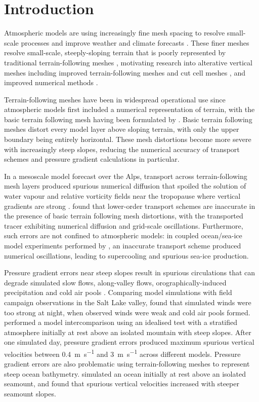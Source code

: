 \chapter{Introduction}

Atmospheric models are using increasingly fine mesh spacing to resolve small-scale processes and improve weather and climate forecasts \citep{wedi2014}.
These finer meshes resolve small-scale, steeply-sloping terrain that is poorly represented by traditional terrain-following meshes \citep{schaer2002}, motivating research into alterative vertical meshes including improved terrain-following meshes \citep{schaer2002,klemp2011} and cut cell meshes \citep{jaehn2015,yamazaki2016}, and improved numerical methods \citep{zaengl2012,steppeler-klemp2017}.

Terrain-following meshes have been in widespread operational use since atmospheric models first included a numerical representation of terrain, with the basic terrain following mesh having been formulated by \citet{galchen-somerville1975a}.
Basic terrain following meshes distort every model layer above sloping terrain, with only the upper boundary being entirely horizontal.
These mesh distortions become more severe with increasingly steep slopes, reducing the numerical accuracy of transport schemes and pressure gradient calculations in particular.

In a mesoscale model forecast over the Alps, transport across terrain-following mesh layers produced spurious numerical diffusion that spoiled the solution of water vapour and relative vorticity fields near the tropopause where vertical gradients are strong \citep{hoinka-zaengl2004}.
\citet{schaer2002} found that lower-order transport schemes are inaccurate in the presence of basic terrain following mesh distortions, with the transported tracer exhibiting numerical diffusion and grid-scale oscillations.
Furthermore, such errors are not confined to atmospheric models: in coupled ocean/sea-ice model experiments performed by \citet{naughten2017}, an inaccurate transport scheme produced numerical oscillations, leading to supercooling and spurious sea-ice production.

Pressure gradient errors near steep slopes result in spurious circulations that can degrade simulated slow flows, along-valley flows, orographically-induced precipitation and cold air pools \citep{zaengl2004a}.
Comparing model simulations with field campaign observations in the Salt Lake valley, \citet{fast2003} found that simulated winds were too strong at night, when observed winds were weak and cold air pools formed.
\citet{zaengl2004a} performed a model intercomparison using an idealised test with a stratified atmosphere initially at rest above an isolated mountain with steep slopes.
After one simulated day, pressure gradient errors produced maximum spurious vertical velocities between \SI{0.4}{\meter\per\second} and \SI{3}{\meter\per\second} across different models.
Pressure gradient errors are also problematic using terrain-following meshes to represent steep ocean bathymetry.  
\citet{luo2002} simulated an ocean initially at rest above an isolated seamount, and found that spurious vertical velocities increased with steeper seamount slopes.



